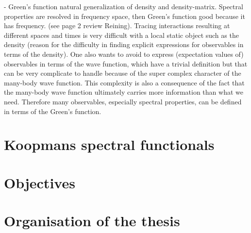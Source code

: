 - Green's function natural generalization of density and density-matrix. Spectral properties are resolved in frequency space, then Green's function good because it has frequency. (see page 2 review Reining). Tracing interactions resulting at different spaces and times is very difficult with a local static object such as the density (reason for the difficulty in finding explicit expressions for observables in terms of the density). One also wants to avoid to express (expectation values of) observables in terms of the wave function, which have a trivial definition but that can be very complicate to handle because of the super complex character of the many-body wave function. This complexity is also a consequence of the fact that the many-body wave function ultimately carries more information than what we need. Therefore many observables, especially spectral properties, can be defined in terms of the Green's function.

\section{Koopmans spectral functionals}

\section{Objectives}

\section{Organisation of the thesis}


